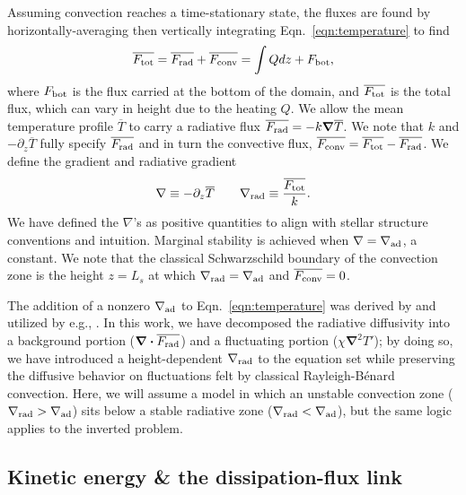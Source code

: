 \documentclass[twocolumn]{aastex631}
\newcommand{\gradrad}{\ensuremath{\nabla_{\rm{rad}}}}
\newcommand{\gradad}{\ensuremath{\nabla_{\rm{ad}}}}
\newcommand{\justgrad}{\ensuremath{\nabla}}
\newcommand{\Fbot}{\ensuremath{F_{\rm{bot}}}}
\newcommand{\Ftot}{\ensuremath{F_{\rm{tot}}}}
\newcommand{\Frad}{\ensuremath{F_{\rm{rad}}}}
\newcommand{\Fconv}{\ensuremath{F_{\rm{conv}}}}
\renewcommand{\vec}[1]{\boldsymbol{#1}}
\renewcommand{\dot}{\vec{\cdot}}
\renewcommand{\bar}[1]{\overline{#1}}
\newcommand{\grad}{\vec{\nabla}}
\begin{document}
Assuming convection reaches a time-stationary state, the fluxes are found by horizontally-averaging then vertically integrating Eqn.~\ref{eqn:temperature} to find
\begin{equation}
\overline{\Ftot} = \overline{\Frad} + \overline{\Fconv} = \int Q dz + \Fbot,
\label{eqn:flux_definition}
\end{equation}
where $\Fbot$ is the flux carried at the bottom of the domain, and $\overline{\Ftot}$ is the total flux, which can vary in height due to the heating $Q$.
We allow the mean temperature profile $\overline{T}$ to carry a radiative flux $\bar{\Frad} = -k \grad \overline{T}$.
We note that $k$ and $-\partial_z \bar{T}$ fully specify $\bar{\Frad}$ and in turn the convective flux, $\bar{\Fconv} = \bar{\Ftot} - \bar{\Frad}$.
We define the gradient and radiative gradient 
\begin{equation}
\justgrad \equiv -\partial_z \bar{T} \qquad
\gradrad \equiv \frac{\bar{\Ftot}}{k}.
\label{eqn:gradrad_definition}
\end{equation}
We have defined the $\justgrad$'s as positive quantities to align with stellar structure conventions and intuition.
Marginal stability is achieved when $\justgrad = \gradad$, a constant.
We note that the classical Schwarzschild boundary of the convection zone is the height $z = L_s$ at which $\gradrad = \gradad$ and $\bar{\Fconv} = 0$.

The addition of a nonzero $\gradad$ to Eqn.~\ref{eqn:temperature} was derived by \citet{spiegel_veronis_1960} and utilized by e.g., \citet{korre_etal_2019}.
In this work, we have decomposed the radiative diffusivity into a background portion ($\grad\dot \bar{\Frad}$) and a fluctuating portion ($\chi \grad^2 T'$); by doing so, we have introduced a height-dependent $\gradrad$ to the equation set while preserving the diffusive behavior on fluctuations felt by classical Rayleigh-B\'{e}nard convection.
Here, we will assume a model in which an unstable convection zone ($\gradrad > \gradad$) sits below a stable radiative zone ($\gradrad < \gradad$), but the same logic applies to the inverted problem.

\subsection{Kinetic energy \& the dissipation-flux link}
\label{sec:theory_energy}
\end{document}
